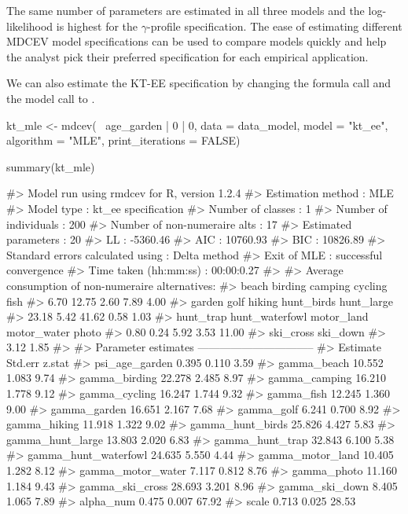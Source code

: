 The same number of parameters are estimated in all three models and the
log-likelihood is highest for the \(\gamma\)-profile specification. The
ease of estimating different MDCEV model specifications can be used to
compare models quickly and help the analyst pick their preferred
specification for each empirical application.

We can also estimate the KT-EE specification by changing the formula
call and the model call to .

\begin{example}
kt_mle <- mdcev(~ age_garden | 0 | 0,
                   data = data_model,
                   model = "kt_ee",
                   algorithm = "MLE",
                   print_iterations = FALSE)
\end{example}

\begin{example}
summary(kt_mle)

#> Model run using rmdcev for R, version 1.2.4 
#> Estimation method                : MLE
#> Model type                       : kt_ee specification
#> Number of classes                : 1
#> Number of individuals            : 200
#> Number of non-numeraire alts     : 17
#> Estimated parameters             : 20
#> LL                               : -5360.46
#> AIC                              : 10760.93
#> BIC                              : 10826.89
#> Standard errors calculated using : Delta method
#> Exit of MLE                      : successful convergence
#> Time taken (hh:mm:ss)            : 00:00:0.27
#> 
#> Average consumption of non-numeraire alternatives:
#>          beach        birding        camping        cycling           fish 
#>           6.70          12.75           2.60           7.89           4.00 
#>         garden           golf         hiking     hunt_birds     hunt_large 
#>          23.18           5.42          41.62           0.58           1.03 
#>      hunt_trap hunt_waterfowl     motor_land    motor_water          photo 
#>           0.80           0.24           5.92           3.53          11.00 
#>      ski_cross       ski_down 
#>           3.12           1.85 
#> 
#> Parameter estimates --------------------------------  
#>                      Estimate Std.err z.stat
#> psi_age_garden          0.395   0.110   3.59
#> gamma_beach            10.552   1.083   9.74
#> gamma_birding          22.278   2.485   8.97
#> gamma_camping          16.210   1.778   9.12
#> gamma_cycling          16.247   1.744   9.32
#> gamma_fish             12.245   1.360   9.00
#> gamma_garden           16.651   2.167   7.68
#> gamma_golf              6.241   0.700   8.92
#> gamma_hiking           11.918   1.322   9.02
#> gamma_hunt_birds       25.826   4.427   5.83
#> gamma_hunt_large       13.803   2.020   6.83
#> gamma_hunt_trap        32.843   6.100   5.38
#> gamma_hunt_waterfowl   24.635   5.550   4.44
#> gamma_motor_land       10.405   1.282   8.12
#> gamma_motor_water       7.117   0.812   8.76
#> gamma_photo            11.160   1.184   9.43
#> gamma_ski_cross        28.693   3.201   8.96
#> gamma_ski_down          8.405   1.065   7.89
#> alpha_num               0.475   0.007  67.92
#> scale                   0.713   0.025  28.53
\end{example}

